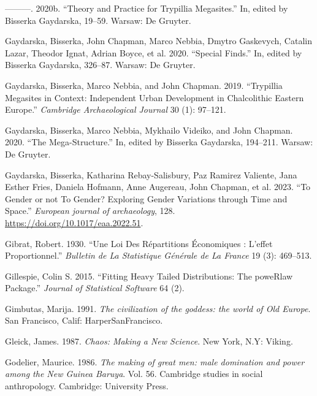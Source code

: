 \documentclass[
  12pt,
  a4paper, twoside]{book}
\newlength{\cslhangindent}
\newlength{\cslentryspacingunit} %
\newenvironment{CSLReferences}[2] %
 {%
  \setlength{\parindent}{0pt}
  \ifodd #1
  \let\oldpar\par
  \def\par{\hangindent=\cslhangindent\oldpar}
  \fi
  \setlength{\parskip}{#2\cslentryspacingunit}
 }%
 {}
\begin{document}
\begin{CSLReferences}{1}{0}
\leavevmode{}%
---------. 2020b. {``Theory and Practice for Trypillia Megasites.''} In, edited by Bisserka Gaydarska, 19--59. Warsaw: De Gruyter.

\leavevmode{}%
Gaydarska, Bisserka, John Chapman, Marco Nebbia, Dmytro Gaskevych, Catalin Lazar, Theodor Ignat, Adrian Boyce, et al. 2020. {``Special Finds.''} In, edited by Bisserka Gaydarska, 326--87. Warsaw: De Gruyter.

\leavevmode{}%
Gaydarska, Bisserka, Marco Nebbia, and John Chapman. 2019. {``Trypillia Megasites in Context: Independent Urban Development in Chalcolithic Eastern Europe.''} \emph{Cambridge Archaeological Journal} 30 (1): 97--121.

\leavevmode{}%
Gaydarska, Bisserka, Marco Nebbia, Mykhailo Videiko, and John Chapman. 2020. {``The Mega-Structure.''} In, edited by Bisserka Gaydarska, 194--211. Warsaw: De Gruyter.

\leavevmode{}%
Gaydarska, Bisserka, Katharina Rebay-Salisbury, Paz Ramirez Valiente, Jana Esther Fries, Daniela Hofmann, Anne Augereau, John Chapman, et al. 2023. {``To Gender or not To Gender? Exploring Gender Variations through Time and Space.''} \emph{European journal of archaeology}, 128. \url{https://doi.org/10.1017/eaa.2022.51}.

\leavevmode{}%
Gibrat, Robert. 1930. {``Une Loi Des Répartitions Économiques : L'effet Proportionnel.''} \emph{Bulletin de La Statistique Générale de La France} 19 (3): 469--513.

\leavevmode{}%
Gillespie, Colin S. 2015. {``Fitting Heavy Tailed Distributions: The poweRlaw Package.''} \emph{Journal of Statistical Software} 64 (2).

\leavevmode{}%
Gimbutas, Marija. 1991. \emph{The civilization of the goddess: the world of Old Europe}. San Francisco, Calif: HarperSanFrancisco.

\leavevmode{}%
Gleick, James. 1987. \emph{Chaos: Making a New Science}. {New York, N.Y}: {Viking}.

\leavevmode{}%
Godelier, Maurice. 1986. \emph{The making of great men: male domination and power among the New Guinea Baruya}. Vol. 56. Cambridge studies in social anthropology. Cambridge: University Press.


\end{CSLReferences}
\end{document}
